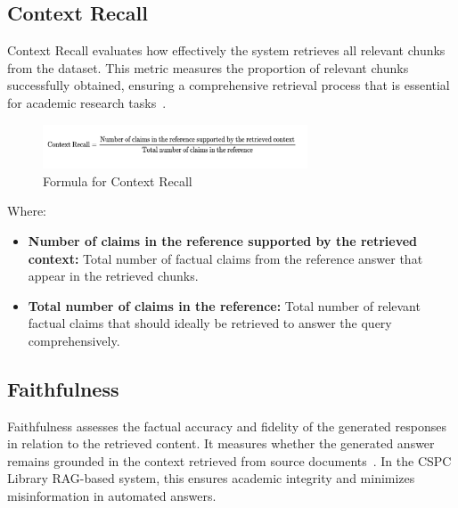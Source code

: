 \begin{refsection}
\subsection*{Context Recall}

Context Recall evaluates how effectively the system retrieves all relevant chunks from the dataset. This metric measures the proportion of relevant chunks successfully obtained, ensuring a comprehensive retrieval process that is essential for academic research tasks~\cite{danter2024advanced}.


\begin{figure}[H]
\centering
\includegraphics[width=0.7\textwidth]{figures/context_recall_formula.png}
\caption{Formula for Context Recall}
\label{fig:context_recall}
\end{figure}

\noindent Where:
\begin{itemize}
    \item \textbf{Number of claims in the reference supported by the retrieved context:} Total number of factual claims from the reference answer that appear in the retrieved chunks.
    \item \textbf{Total number of claims in the reference:} Total number of relevant factual claims that should ideally be retrieved to answer the query comprehensively.
\end{itemize}

\subsection*{Faithfulness}

Faithfulness assesses the factual accuracy and fidelity of the generated responses in relation to the retrieved content. It measures whether the generated answer remains grounded in the context retrieved from source documents~\cite{lin2024satisfaction}. In the CSPC Library RAG-based system, this ensures academic integrity and minimizes misinformation in automated answers.


\end{refsection}
